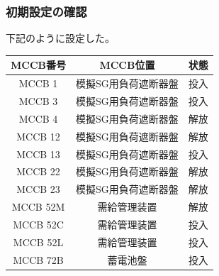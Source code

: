 \documentclass[a4paper,11pt,xelatex,ja=standard]{bxjsarticle}
\begin{document}
                \subsubsection{初期設定の確認}
                    下記のように設定した。
                    \begin{tabular}{|c|c|c|}
                        \hline
                        \textbf{MCCB番号} & \textbf{MCCB位置} & \textbf{状態} \\
                        \hline
                        MCCB 1 & 模擬SG用負荷遮断器盤 & 投入 \\
                        \hline
                        MCCB 3 & 模擬SG用負荷遮断器盤 & 投入 \\
                        \hline
                        MCCB 4 & 模擬SG用負荷遮断器盤 & 解放 \\
                        \hline
                        MCCB 12 & 模擬SG用負荷遮断器盤 & 解放 \\
                        \hline
                        MCCB 13 & 模擬SG用負荷遮断器盤 & 投入 \\
                        \hline
                        MCCB 22 & 模擬SG用負荷遮断器盤 & 解放 \\
                        \hline
                        MCCB 23 & 模擬SG用負荷遮断器盤 & 解放 \\
                        \hline
                        MCCB 52M & 需給管理装置 & 解放 \\
                        \hline
                        MCCB 52C & 需給管理装置 & 投入 \\
                        \hline
                        MCCB 52L & 需給管理装置 & 投入 \\
                        \hline
                        MCCB 72B & 蓄電池盤 & 投入 \\
                        \hline
                    \end{tabular}
\end{document}

